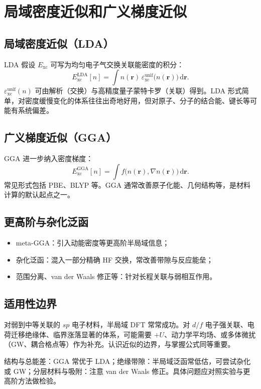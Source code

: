 \section{局域密度近似和广义梯度近似}

\subsection{局域密度近似（LDA）}

LDA 假设 $E_{\mathrm{xc}}$ 可写为均匀电子气交换关联能密度的积分：
\begin{equation}
  E_{\mathrm{xc}}^{\mathrm{LDA}}[n]
  =\int n(\mathbf{r})\,
  \varepsilon_{\mathrm{xc}}^{\mathrm{unif}}\bigl(n(\mathbf{r})\bigr)\,
  \mathrm{d}\mathbf{r}.
\end{equation}
$\varepsilon_{\mathrm{xc}}^{\mathrm{unif}}(n)$ 可由解析（交换）与高精度量子蒙特卡罗（关联）得到。LDA 形式简单，对密度缓慢变化的体系往往出奇地好用，但对原子、分子的结合能、键长等可能有系统偏差。

\subsection{广义梯度近似（GGA）}

GGA 进一步纳入密度梯度：
\begin{equation}
  E_{\mathrm{xc}}^{\mathrm{GGA}}[n]
  =\int
  f\bigl(n(\mathbf{r}),\nabla n(\mathbf{r})\bigr)\,
  \mathrm{d}\mathbf{r}.
\end{equation}
常见形式包括 PBE、BLYP 等。GGA 通常改善原子化能、几何结构等，是材料计算的默认起点之一。

\subsection{更高阶与杂化泛函}

\begin{itemize}
  \item meta-GGA：引入动能密度等更高阶半局域信息；
  \item 杂化泛函：混入一部分精确 HF 交换，常改善带隙与反应能垒；
  \item 范围分离、van der Waals 修正等：针对长程关联与弱相互作用。
\end{itemize}

\subsection{适用性边界}

对弱到中等关联的 $sp$ 电子材料，半局域 DFT 常常成功。对 $d/f$ 电子强关联、电荷迁移绝缘体、临界涨落显著的体系，可能需要 $+U$、动力学平均场、或多体微扰（GW、耦合格点等）作为补充。认识近似的边界，与掌握公式同等重要。

\begin{example}[选择泛函的经验原则]
结构与总能差：GGA 常优于 LDA；绝缘带隙：半局域泛函常低估，可尝试杂化或 GW；分层材料与吸附：注意 van der Waals 修正。具体问题应对照实验与更高阶方法做检验。
\end{example}
